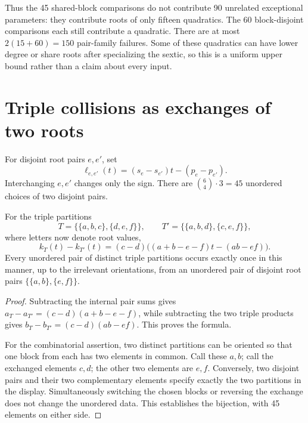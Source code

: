 \documentclass[11pt,letterpaper]{article}
\numberwithin{equation}{section}
\theoremstyle{definition}
\theoremstyle{remark}
\begin{document}
Thus the 45 shared-block comparisons do not contribute 90 unrelated
exceptional parameters: they contribute roots of only fifteen quadratics.
The 60 block-disjoint comparisons each still contribute a quadratic.
There are at most $2(15+60)=150$ pair-family failures. Some of these
quadratics can have lower degree or share roots after specializing the
sextic, so this is a uniform upper bound rather than a claim about every
input.

\section{Triple collisions as exchanges of two roots}
\label{sbr:sec:triple-collisions}

For disjoint root pairs $e,e'$, set
\begin{equation}
 \ell_{e,e'}(t)=(s_e-s_{e'})t-(p_e-p_{e'}).
 \label{sbr:eq:ell}
\end{equation}
Interchanging $e,e'$ changes only the sign. There are
$\binom64\cdot3=45$ unordered choices of two disjoint pairs.

\begin{lemma}
\label{sbr:lem:exchange}
For the triple partitions
\[
T=\{\{a,b,c\},\{d,e,f\}\},\qquad
T'=\{\{a,b,d\},\{c,e,f\}\},
\]
where letters now denote root values,
\begin{equation}
 k_T(t)-k_{T'}(t)
   =(c-d)\bigl((a+b-e-f)t-(ab-ef)\bigr).
 \label{sbr:eq:exchange}
\end{equation}
Every unordered pair of distinct triple partitions occurs exactly once in
this manner, up to the irrelevant orientations, from an unordered pair of
disjoint root pairs $\{\{a,b\},\{e,f\}\}$.
\end{lemma}
\begin{proof}
Subtracting the internal pair sums gives
$a_T-a_{T'}=(c-d)(a+b-e-f)$, while subtracting the two triple products gives
$b_T-b_{T'}=(c-d)(ab-ef)$. This proves the formula.

For the combinatorial assertion, two distinct partitions can be oriented so
that one block from each has two elements in common. Call these $a,b$;
call the exchanged elements $c,d$; the other two elements are $e,f$.
Conversely, two disjoint pairs and their two complementary elements specify
exactly the two partitions in the display. Simultaneously switching the
chosen blocks or reversing the exchange does not change the unordered data.
This establishes the bijection, with 45 elements on either side.
\end{proof}
\end{document}
